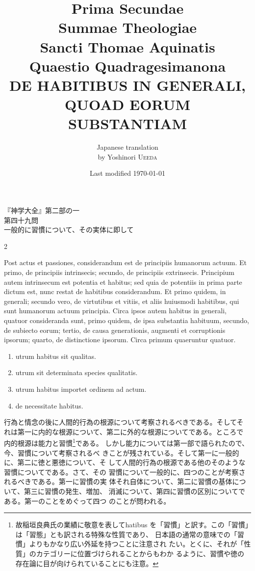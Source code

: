 \documentclass[paper=a4paper,fontsize=10pt,jafontsize=9pt,titlepage]{jlreq}
\title{{\bfseries Prima Secundae}\\{\Huge Summae Theologiae}\\Sancti Thomae
Aquinatis\\{\sffamily Quaestio Quadragesimanona}\\{\bfseries DE HABITIBUS IN GENERALI,\\QUOAD EORUM SUBSTANTIAM}}
\author{Japanese translation\\by Yoshinori {\scshape Ueeda}}
\date{Last modified \today}
\begin{document}
\maketitle

\begin{center}
{\Large 『神学大全』第二部の一\\第四十九問\\
一般的に習慣について、その実体に即して}
\end{center}

\newpage
\begin{paracol}{2}

Post actus et passiones, considerandum est de principiis humanorum
actuum. Et primo, de principiis intrinsecis; secundo, de principiis
extrinsecis. Principium autem intrinsecum est potentia et habitus; sed
quia de potentiis in prima parte dictum est, nunc restat de habitibus
considerandum. Et primo quidem, in generali; secundo vero, de
virtutibus et vitiis, et aliis huiusmodi habitibus, qui sunt humanorum
actuum principia. Circa ipsos autem habitus in generali, quatuor
consideranda sunt, primo quidem, de ipsa substantia habituum, secundo,
de subiecto eorum; tertio, de causa generationis, augmenti et
corruptionis ipsorum; quarto, de distinctione ipsorum. Circa primum
quaeruntur quatuor. 

\begin{enumerate}
 \item utrum habitus sit qualitas. 
 \item utrum sit determinata species qualitatis.
 \item utrum habitus importet ordinem ad actum.
 \item de necessitate habitus.
\end{enumerate}

\switchcolumn

行為と情念の後に人間的行為の根源について考察されるべきである。そしてそ
れは第一に内的な根源について、第二に外的な根源についてである。ところで
内的根源は能力と習慣\footnote{故稲垣良典氏の業績に敬意を表してhatibus
を「習慣」と訳す。この「習慣」は「習態」とも訳される特殊な性質であり、
日本語の通常の意味での「習慣」よりもかなり広い外延を持つことに注意され
たい。とくに、それが「性質」のカテゴリーに位置づけられることからもわか
るように、習慣や徳の存在論に目が向けられていることにも注意。}である。
しかし能力については第一部で語られたので、今、習慣について考察されるべ
きことが残されている。そして第一に一般的に、第二に徳と悪徳について、そ
して人間的行為の根源である他のそのような習慣についてである。さて、その
習慣について一般的に、四つのことが考察されるべきである。第一に習慣の実
体それ自体について、第二に習慣の基体について、第三に習慣の発生、増加、
消滅について、第四に習慣の区別についてである。第一のことをめぐって四つ
のことが問われる。


\end{paracol}
\end{document}
